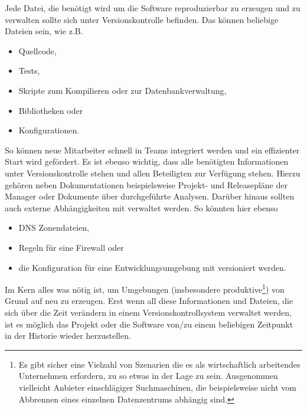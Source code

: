 Jede Datei, die benötigt wird um die Software reproduzierbar zu erzeugen und zu
verwalten sollte sich unter Versionskontrolle befinden. Das können beliebige
Dateien sein, wie z.B.

\begin{itemize}
\item Quellcode,
\item Tests,
\item Skripte zum Kompilieren oder zur Datenbankverwaltung,
\item Bibliotheken oder
\item Konfigurationen.
\end{itemize}

So können neue Mitarbeiter schnell in Teams integriert werden und ein
effizienter Start wird gefördert. Es ist ebenso wichtig, dass alle benötigten
Informationen unter Versionskontrolle stehen und allen Beteiligten zur Verfügung
stehen. Hierzu gehören neben Dokumentationen beispielsweise Projekt- und
Releasepläne der Manager oder Dokumente über durchgeführte Analysen. Darüber
hinaus sollten auch externe Abhängigkeiten mit verwaltet werden. So könnten
hier ebenso

\begin{itemize}
\item DNS Zonendateien,
\item Regeln für eine Firewall oder
\item die Konfiguration für eine Entwicklungsumgebung mit versioniert werden.
\end{itemize}

Im Kern alles was nötig ist, um Umgebungen (insbesondere produktive\footnote{Es
gibt sicher eine Vielzahl von Szenarien die es als wirtschaftlich arbeitendes
Unternehmen erfordern, zu so etwas in der Lage zu sein. Ausgenommen vielleicht
Anbieter einschlägiger Suchmaschinen, die beispielsweise nicht vom Abbrennen
eines einzelnen Datenzentrums abhängig sind.}) von Grund auf neu zu erzeugen.
Erst wenn all diese Informationen und Dateien, die sich über die Zeit
verändern in einem Versionskontrollsystem verwaltet werden, ist es möglich das
Projekt oder die Software von/zu einem beliebigen Zeitpunkt in der Historie
wieder herzustellen.\cite[S.~33]{cd}

